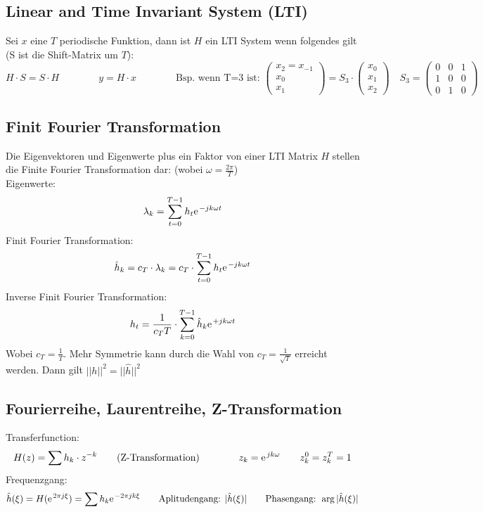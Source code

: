 \subsection{Linear and Time Invariant System (LTI)}
Sei $x$ eine $T$ periodische Funktion, dann ist $H$ ein LTI System wenn folgendes gilt (S ist die Shift-Matrix um $T$):
\[ 	H\cdot S = S\cdot H \qquad \qquad y=H\cdot x 
	\qquad \qquad 
	\text{Bsp. wenn T=3 ist: } \left( \begin{array}{ccc} x_2=x_{-1} \\ x_0 \\ x_1 \end{array} \right) = S_3 \cdot \left( \begin{array}{ccc} x_0 \\ x_1 \\ x_2 \end{array} \right) \quad
	S_3=
	\left( \begin{array}{ccc}
	0 & 0 & 1 \\
	1 & 0 & 0 \\
	0 & 1 & 0 
	\end{array} \right) 
\]


\subsection{Finit Fourier Transformation}
Die Eigenvektoren und Eigenwerte plus ein Faktor von einer LTI Matrix $H$ stellen die Finite Fourier Transformation dar: (wobei $\omega = \frac{2\pi}{T}$)\\

Eigenwerte: \[ \lambda_k = \sum_{t=0}^{T-1} h_t \e^{-jk\omega t} \]
Finit Fourier Transformation: \[ \hat{h}_k = c_T \cdot \lambda_k = c_T \cdot \sum_{t=0}^{T-1} h_t \e^{-jk\omega t} \]
Inverse Finit Fourier Transformation: \[ h_t = \frac{1}{c_T T} \cdot \sum_{k=0}^{T-1}\hat{h}_k \e^{+jk\omega t} \]
Wobei $c_T = \frac{1}{T}$. Mehr Symmetrie kann durch die Wahl von $c_T = \frac{1}{\sqrt{T}}$ erreicht werden. Dann gilt $||h||^2=||\hat{h}||^2$


\subsection{Fourierreihe, Laurentreihe, Z-Transformation}

Transferfunction: \[ H(z)=\sum h_k \cdot z^{-k} \qquad \text{(Z-Transformation)} \qquad \qquad z_k=\e^{jk\omega} \qquad z_k^0=z_k^T=1 \]
Frequenzgang: \[ \hat{h}(\xi) = H(\e^{2\pi j \xi})=\sum h_k \e^{-2\pi jk \xi} \qquad \text{Aplitudengang: } |\hat{h}(\xi)| \qquad \text{Phasengang: } \arg|\hat{h}(\xi)| \]

